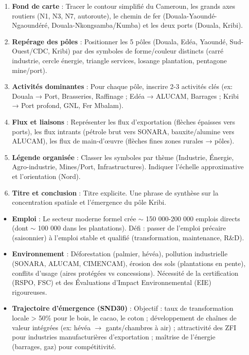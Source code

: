 \documentclass[11pt]{article}
\begin{document}
\begin{methode}
\begin{enumerate}
    \item \textbf{Fond de carte} : Tracer le contour simplifié du Cameroun, les grands axes routiers (N1, N3, N7, autoroute), le chemin de fer (Douala-Yaoundé-Ngaoundéré, Douala-Nkongsamba/Kumba) et les deux ports (Douala, Kribi).
    \item \textbf{Repérage des pôles} : Positionner les 5 pôles (Douala, Edéa, Yaoundé, Sud-Ouest/CDC, Kribi) par des symboles de forme/couleur distincts (carré industrie, cercle énergie, triangle services, losange plantation, pentagone mine/port).
    \item \textbf{Activités dominantes} : Pour chaque pôle, inscrire 2-3 activités clés (ex: Douala → Port, Brasseries, Raffinage ; Edéa → ALUCAM, Barrages ; Kribi → Port profond, GNL, Fer Mbalam).
    \item \textbf{Flux et liaisons} : Représenter les flux d'exportation (flèches épaisses vers ports), les flux intrants (pétrole brut vers SONARA, bauxite/alumine vers ALUCAM), les flux de main-d'œuvre (flèches fines zones rurales → pôles).
    \item \textbf{Légende organisée} : Classer les symboles par thème (Industrie, Énergie, Agro-industrie, Mines/Port, Infrastructures). Indiquer l'échelle approximative et l'orientation (Nord).
    \item \textbf{Titre et conclusion} : Titre explicite. Une phrase de synthèse sur la concentration spatiale et l'émergence du pôle Kribi.
\end{enumerate}
\end{methode}

\begin{aretenir}
\begin{itemize}
    \item \textbf{Emploi} : Le secteur moderne formel crée $\sim$ 150 000-200 000 emplois directs (dont $\sim$ 100 000 dans les plantations). Défi : passer de l'emploi précaire (saisonnier) à l'emploi stable et qualifié (transformation, maintenance, R\&D).
    \item \textbf{Environnement} : Déforestation (palmier, hévéa), pollution industrielle (SONARA, ALUCAM, CIMENCAM), érosion des sols (plantations en pente), conflits d'usage (aires protégées vs concessions). Nécessité de la certification (RSPO, FSC) et des Évaluations d'Impact Environnemental (EIE) rigoureuses.
    \item \textbf{Trajectoire d'émergence (SND30)} : Objectif : taux de transformation locale > 50\% pour le bois, le cacao, le coton ; développement de chaînes de valeur intégrées (ex: hévéa $\to$ gants/chambres à air) ; attractivité des ZFI pour industries manufacturières d'exportation ; maîtrise de l'énergie (barrages, gaz) pour compétitivité.
\end{itemize}
\end{aretenir}
\end{document}
